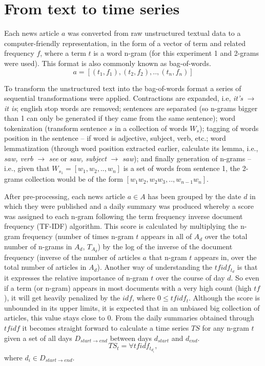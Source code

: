 \documentclass{article}
\begin{document}
\section{From text to time series}
Each news article \(a\) was converted from raw unstructured textual data to a computer-friendly representation, in the form of a vector of term and related frequency \(f\), where a term \(t\) is a word n-gram (for this experiment 1 and 2-grams were used). This format is also commonly known as bag-of-words.
\[a=[(t_1,f_1),(t_2,f_2),..,(t_n,f_n)]\]
\par
To transform the unstructured text into the bag-of-words format a series of sequential transformations were applied. Contractions are expanded, i.e, \textit{it's} \(\to\) \textit{it is}; english stop words are removed; sentences are separated (so n-grams bigger than 1 can only be generated if they came from the same sentence); word tokenization (transform sentence \(s\) in a collection of words \(W_s\)); tagging of words position in the sentence -- if word is adjective, subject, verb, etc.; word lemmatization (through word position extracted earlier, calculate its lemma, i.e., \textit{saw, verb} \(\to\) \textit{see} or \textit{saw, subject} \(\to\) \textit{saw}); and finally generation of n-grams -- i.e., given that \(W_{s_1}=[w_1,w_2,..,w_n]\) is a set of words from sentence 1, the 2-grams collection would be of the form \([w_1 w_2,w_2 w_3,..,w_{n-1} w_n]\).
\par
After pre-processing, each news article \(a \in A\) has been grouped by the date \(d\) in which they were published and a daily summary was produced whereby a score was assigned to each n-gram following the term frequency inverse document frequency (TF-IDF) algorithm. This score is calculated by multiplying the n-gram frequency (number of times n-gram \(t\) appears in all of \(A_d\) over the total number of n-grams in \(A_d\), \(T_{A_d}\)) by the log of the inverse of the document frequency (inverse of the number of articles \(a\) that n-gram \(t\) appears in, over the total number of articles in \(A_d\)). Another way of understanding the \(tfidf_{t_d}\) is that it expresses the relative importance of n-gram \(t\) over the course of day \(d\). So even if a term (or n-gram) appears in most documents with a very high count (high \(tf\)), it will get heavily penalized by the \(idf\), where \(0 \leq tfidf_t\). Although the score is unbounded in its upper limits, it is expected that in an unbiased big collection of articles, this value stays close to \(0\).
From the daily summaries obtained through \(tfidf\) it becomes straight forward to calculate a time series \(TS\) for any n-gram \(t\) given a set of all days \(D_{start \to end}\) between days \(d_{start}\) and \(d_{end}\).
\[TS_t=\forall{tfidf_{t_{d_i}}},\] where \(d_i \in D_{start \to end}\).
\end{document}
